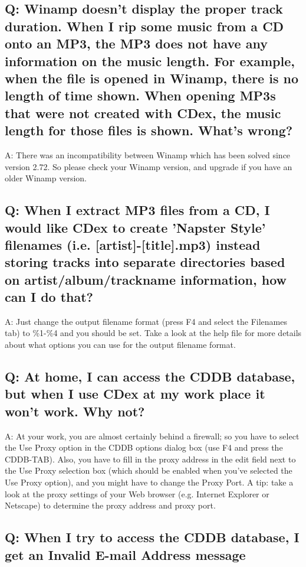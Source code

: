 \subsection{Q: Winamp doesn't display the proper track duration. When I rip some 
music from a CD onto an MP3, the MP3 does not have any information on the music 
length. For example, when the file is opened in Winamp, there is no length of 
time shown. When opening MP3s that were not created with CDex, the music length 
for those files is shown. What's wrong?}

A: There was an incompatibility between Winamp which has been solved since version 2.72.
So please check your Winamp version, and upgrade if you have an older Winamp version.

\subsection{Q: When I extract MP3 files from a CD, I would like CDex to create 
'Napster Style' filenames (i.e. [artist]-[title].mp3) instead storing tracks 
into separate directories based on artist/album/trackname information, 
how can I do that?}

A: Just change the output filename format (press F4 and select the 
Filenames tab) to \%1-\%4 and you should be set. Take a look at the help file
for more details about what options you can use for the output filename format.


\subsection{Q: At home, I can access the CDDB database, but when I use CDex 
at my work place it won't work. Why not?}

A: At your work, you are almost certainly behind a firewall; so you 
have to select the Use Proxy option in the CDDB options dialog box (use 
F4 and press the CDDB-TAB). Also, you have to fill in the proxy 
address in the edit field next to the Use Proxy selection box (which 
should be enabled when you've selected the Use Proxy option), and you might
have to change the Proxy Port.  A tip: take a look at the proxy settings 
of your Web browser (e.g. Internet Explorer or Netscape) to determine 
the proxy address and proxy port.

\subsection{Q: When I try to access the CDDB database, I get an Invalid 
E-mail Address message}

